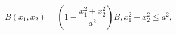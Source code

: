 \begin{equation}
\label{Eq_0609}
B(x_1, x_2) = \left( 1 - \frac{x^2_1 + x^2_2}{a^2} \right) B,
  x^2_1 + x^2_2 \le a^2,
\end{equation}

